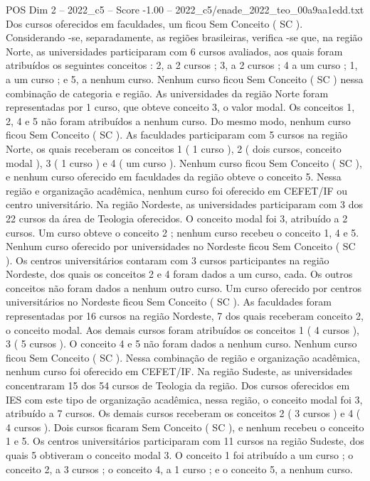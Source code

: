 \begin{textsample}{POS Dim 2 – 2022\_c5 – Score -1.00 – 2022\_c5/enade\_2022\_teo\_00a9aa1edd.txt}
Dos cursos oferecidos em faculdades, um ficou Sem Conceito ( SC ).
Considerando -se, separadamente, as regiões brasileiras, verifica -se que, na região Norte, as universidades participaram com 6 cursos avaliados, aos quais foram atribuídos os seguintes conceitos : 2, a 2 cursos ; 3, a 2 cursos ; 4 a um curso ; 1, a um curso ; e 5, a nenhum curso.
Nenhum curso ficou Sem Conceito ( SC ) nessa combinação de categoria e região.
As universidades da região Norte foram representadas por 1 curso, que obteve conceito 3, o valor modal.
Os conceitos 1, 2, 4 e 5 não foram atribuídos a nenhum curso.
Do mesmo modo, nenhum curso ficou Sem Conceito ( SC ).
As faculdades participaram com 5 cursos na região Norte, os quais receberam os conceitos 1 ( 1 curso ), 2 ( dois cursos, conceito modal ), 3 ( 1 curso ) e 4 ( um curso ).
Nenhum curso ficou Sem Conceito ( SC ), e nenhum curso oferecido em faculdades da região obteve o conceito 5.
Nessa região e organização acadêmica, nenhum curso foi oferecido em CEFET/IF ou centro universitário.
Na região Nordeste, as universidades participaram com 3 dos 22 cursos da área de Teologia oferecidos.
O conceito modal foi 3, atribuído a 2 cursos.
Um curso obteve o conceito 2 ; nenhum curso recebeu o conceito 1, 4 e 5.
Nenhum curso oferecido por universidades no Nordeste ficou Sem Conceito ( SC ).
Os centros universitários contaram com 3 cursos participantes na região Nordeste, dos quais os conceitos 2 e 4 foram dados a um curso, cada.
Os outros conceitos não foram dados a nenhum outro curso.
Um curso oferecido por centros universitários no Nordeste ficou Sem Conceito ( SC ).
As faculdades foram representadas por 16 cursos na região Nordeste, 7 dos quais receberam conceito 2, o conceito modal.
Aos demais cursos foram atribuídos os conceitos 1 ( 4 cursos ), 3 ( 5 cursos ).
O conceito 4 e 5 não foram dados a nenhum curso.
Nenhum curso ficou Sem Conceito ( SC ).
Nessa combinação de região e organização acadêmica, nenhum curso foi oferecido em CEFET/IF.
Na região Sudeste, as universidades concentraram 15 dos 54 cursos de Teologia da região.
Dos cursos oferecidos em IES com este tipo de organização acadêmica, nessa região, o conceito modal foi 3, atribuído a 7 cursos.
Os demais cursos receberam os conceitos 2 ( 3 cursos ) e 4 ( 4 cursos ).
Dois cursos ficaram Sem Conceito ( SC ), e nenhum recebeu o conceito 1 e 5.
Os centros universitários participaram com 11 cursos na região Sudeste, dos quais 5 obtiveram o conceito modal 3.
O conceito 1 foi atribuído a um curso ; o conceito 2, a 3 cursos ; o conceito 4, a 1 curso ; e o conceito 5, a nenhum curso.

\end{textsample}
